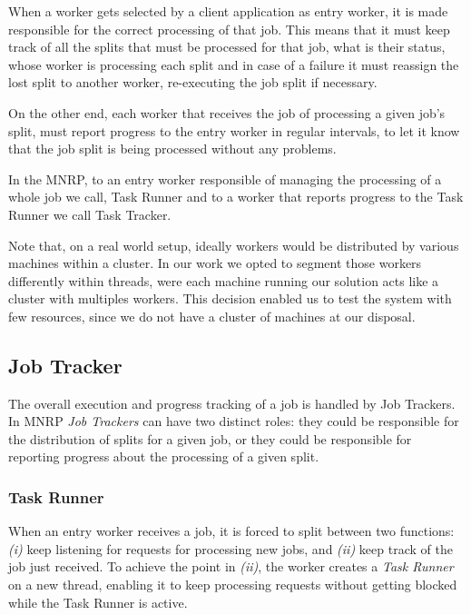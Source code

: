 \documentclass[times, 10pt,twocolumn]{article}
\begin{document}
        When a worker gets selected by a client application as entry worker, it is made responsible for the correct processing of that job. This means that it must keep track of all the splits that must be processed for that job, what is their status, whose worker is processing each split and in case of a failure it must reassign the lost split to another worker, re-executing the job split if necessary.
        
        On the other end, each worker that receives the job of processing a given job's split, must report progress to the entry worker in regular intervals, to let it know that the job split is being processed without any problems.
        
        In the \ac{MNRP}, to an entry worker responsible of managing the processing of a whole job we call, Task Runner and to a worker that reports progress to the Task Runner we call Task Tracker.
        
        Note that, on a real world setup, ideally workers would be distributed by various machines within a cluster. In our work we opted to segment those workers differently within threads, were each machine running our solution acts like a cluster with multiples workers. This decision enabled us to test the system with few resources, since we do not have a cluster of machines at our disposal.
       
    	\subsection{Job Tracker}
        
        The overall execution and progress tracking of a job is handled by Job Trackers. In \ac{MNRP} \emph{Job Trackers} can have two distinct roles: they could be responsible for the distribution of splits for a given job, or they could be responsible for reporting progress about the processing of a given split.        
               
            \subsubsection{Task Runner}
            
            When an entry worker receives a job, it is forced to split between two functions: {\it (i)} keep listening for requests for processing new jobs, and {\it (ii)} keep track of the job just received. To achieve the point in {\it (ii)}, the worker creates a \emph{Task Runner} on a new thread, enabling it to keep processing requests without getting blocked while the Task Runner is active.
            
\end{document}
